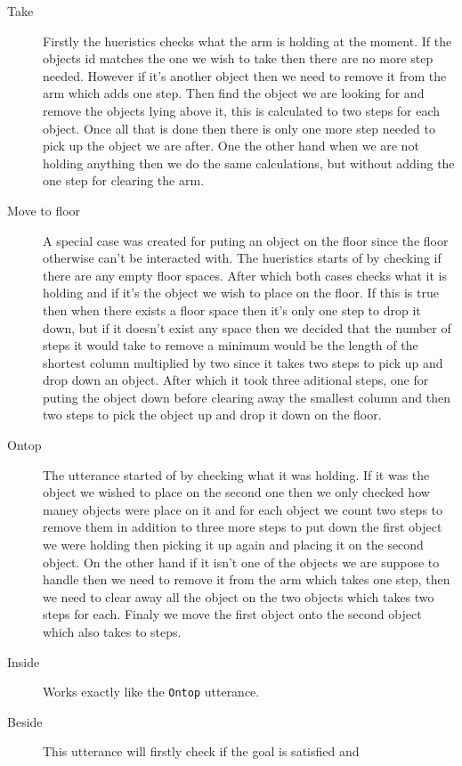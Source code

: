 \begin{description}
  \item[Take] Firstly the hueristics checks what the arm is holding at the
    moment. If the objects id matches the one we wish to take then there are no
    more step needed. However if it's another object then we need to remove it from
    the arm which adds one step. Then find the object we are looking for and remove
    the objects lying above it, this is calculated to two steps for each object.
    Once all that is done then there is only one more step needed to pick up the
    object we are after. One the other hand when we are not holding anything then
    we do the same calculations, but without adding the one step for clearing the
    arm.
  \item[Move to floor] A special case was created for puting an object on the
    floor since the floor otherwise can't be interacted with. The hueristics
    starts of by checking if there are any empty floor spaces. After which both
    cases checks what it is holding and if it's the object we wish to place on
    the floor. If this is true then when there exists a floor space then it's
    only one step to drop it down, but if it doesn't exist any space then we
    decided that the number of steps it would take to remove a minimum would be
    the length of the shortest column multiplied by two since it takes two steps
    to pick up and drop down an object. After which it took three aditional
    steps, one for puting the object down before clearing away the smallest
    column and then two steps to pick the object up and drop it down on the
    floor.
  \item[Ontop] The utterance started of by checking what it was holding. If it
    was the object we wished to place on the second one then we only checked how
    maney objects were place on it and for each object we count two steps to
    remove them in addition to three more steps to put down the first object we
    were holding then picking it up again and placing it on the second object.
    On the other hand if it isn't one of the objects we are suppose to handle
    then we need to remove it from the arm which takes one step, then we need to
    clear away all the object on the two objects which takes two steps for each.
    Finaly we move the first object onto the second object which also takes to
    steps.
  \item[Inside] Works exactly like the \verb|Ontop| utterance.
  \item[Beside] This utterance will firstly check if the goal is satisfied and

\end{description}

